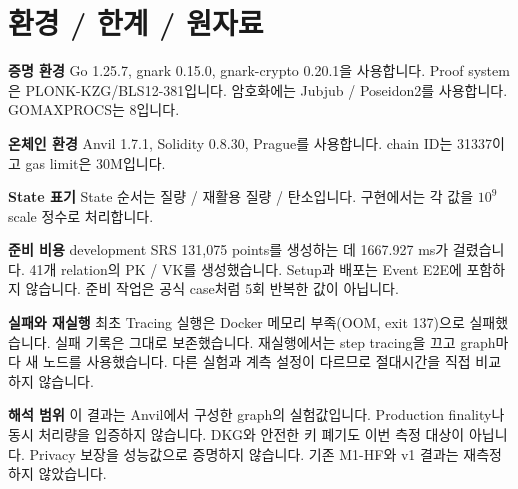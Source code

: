 \documentclass[11pt,a4paper]{article}
\begin{document}
\section*{환경 / 한계 / 원자료}
\textbf{증명 환경}\newline
Go 1.25.7, gnark 0.15.0, gnark-crypto 0.20.1을 사용합니다.\newline
Proof system은 PLONK-KZG/BLS12-381입니다.\newline
암호화에는 Jubjub / Poseidon2를 사용합니다.\newline
GOMAXPROCS는 8입니다.\par\smallskip
\textbf{온체인 환경}\newline
Anvil 1.7.1, Solidity 0.8.30, Prague를 사용합니다.\newline
chain ID는 31337이고 gas limit은 30M입니다.\par\smallskip
\textbf{State 표기}\newline
State 순서는 질량 / 재활용 질량 / 탄소입니다.\newline
구현에서는 각 값을 $10^{9}$ scale 정수로 처리합니다.

\textbf{준비 비용}\newline
development SRS 131,075 points를 생성하는 데 1667.927 ms가 걸렸습니다.\newline
41개 relation의 PK / VK를 생성했습니다.\newline
Setup과 배포는 Event E2E에 포함하지 않습니다.\newline
준비 작업은 공식 case처럼 5회 반복한 값이 아닙니다.

\textbf{실패와 재실행}\newline
최초 Tracing 실행은 Docker 메모리 부족(OOM, exit 137)으로 실패했습니다.\newline
실패 기록은 그대로 보존했습니다.\newline
재실행에서는 step tracing을 끄고 graph마다 새 노드를 사용했습니다.\newline
다른 실험과 계측 설정이 다르므로 절대시간을 직접 비교하지 않습니다.

\textbf{해석 범위}\newline
이 결과는 Anvil에서 구성한 graph의 실험값입니다.\newline
Production finality나 동시 처리량을 입증하지 않습니다.\newline
DKG와 안전한 키 폐기도 이번 측정 대상이 아닙니다.\newline
Privacy 보장을 성능값으로 증명하지 않습니다.\newline
기존 M1-HF와 v1 결과는 재측정하지 않았습니다.
\end{document}
